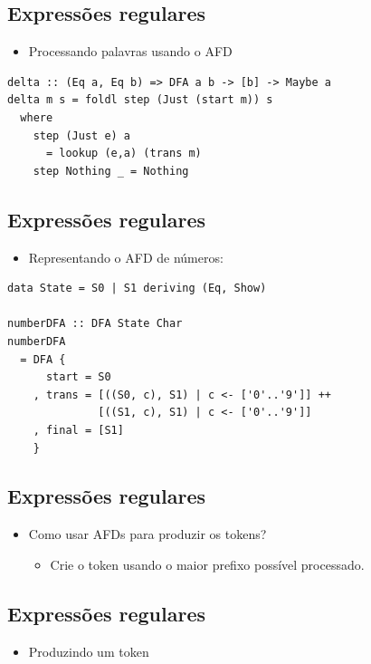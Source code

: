 \documentclass[11pt]{article}
\begin{document}
\subsection*{Expressões regulares}
\label{sec:org453d3cf}

\begin{itemize}
\item Processando palavras usando o AFD
\end{itemize}

\begin{verbatim}
delta :: (Eq a, Eq b) => DFA a b -> [b] -> Maybe a
delta m s = foldl step (Just (start m)) s
  where
    step (Just e) a
      = lookup (e,a) (trans m)
    step Nothing _ = Nothing
\end{verbatim}
\subsection*{Expressões regulares}
\label{sec:orgca3d048}

\begin{itemize}
\item Representando o AFD de números:
\end{itemize}

\begin{verbatim}
data State = S0 | S1 deriving (Eq, Show)

numberDFA :: DFA State Char
numberDFA
  = DFA {
      start = S0
    , trans = [((S0, c), S1) | c <- ['0'..'9']] ++
              [((S1, c), S1) | c <- ['0'..'9']]
    , final = [S1]
    }
\end{verbatim}
\subsection*{Expressões regulares}
\label{sec:orgdfea454}

\begin{itemize}
\item Como usar AFDs para produzir os tokens?
\begin{itemize}
\item Crie o token usando o maior prefixo possível processado.
\end{itemize}
\end{itemize}
\subsection*{Expressões regulares}
\label{sec:org8faf851}

\begin{itemize}
\item Produzindo um token
\end{itemize}
\end{document}
